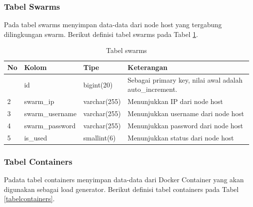 			\subsubsection{Tabel Swarms}
				Pada tabel swarms menyimpan data-data dari node host yang tergabung dilingkungan swarm. Berikut definisi tabel swarms pada Tabel \ref{tabelswarms}.
				
				\begin{longtable}{|p{}|p{}|p{}|p{}|}
					\caption{Tabel swarms} \label{tabelswarms} \\
					\hline
					\textbf{No} & \textbf{Kolom} & \textbf{Tipe} & \textbf{Keterangan} \\ \hline
					\endhead
					\endfoot
					\endlastfoot
					1 & id & bigint(20) & Sebagai primary key, nilai awal adalah auto\_increment. \\ \hline
					2 & swarm\_ip & varchar(255) & Menunjukkan IP dari node host \\ \hline
					3 & swarm\_username & varchar(255) & Menunjukkan username dari node host \\ \hline
					4 & swarm\_password & varchar(255) & Menunjukkan password dari node host \\ \hline
					5 & is\_used & smallint(6) & Menunjukkan status dari node host \\ \hline
				\end{longtable}
		
			\subsubsection{Tabel Containers}
				Padata tabel containers menyimpan data-data dari Docker Container yang akan digunakan sebagai load generator. Berikut definisi tabel containers pada Tabel \ref{tabelcontainers}.
				
